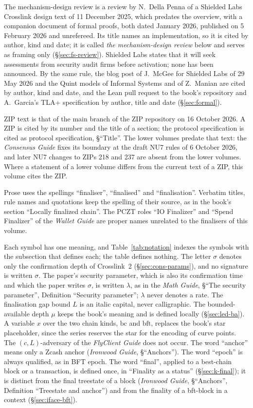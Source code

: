 \documentclass[11pt,a4paper]{article}
\theoremstyle{definition}
\newcommand{\bc}{\mathrm{bc}}
\newcommand{\bft}{\mathrm{bft}}
\begin{document}
The mechanism-design review is a review by N.~Della Penna of a Shielded Labs
Crosslink design text of 11 December 2025, which predates the overview, with
a companion document of formal proofs, both dated January 2026, published on
5 February 2026 and unrefereed. Its title names an implementation, so it is
cited by author, kind and date; it is called \emph{the mechanism-design review}
below and serves as framing only (\S\ref{sec:fs-review}). Shielded Labs states
that it will seek assessments from security audit firms before activation; none
has been announced. By the same rule, the blog post of J.~McGee for Shielded
Labs of 29 May 2026 and the Quint models of Informal Systems and of Z.~Manian
are cited by author, kind and date, and the Lean pull request to the book's
repository and A.~Garcia's TLA+ specification by author, title and date
(\S\ref{sec:formal}).

ZIP text is that of the main branch of the ZIP repository on 16 October
2026. A ZIP is cited by its number and the title of a section; the protocol
specification is cited as protocol specification, \S``Title''. The lower
volumes predate that text: the \emph{Consensus Guide} fixes its boundary at
the draft NU7 rules of 6 October 2026, and later NU7 changes to ZIPs 218 and
237 are absent from the lower volumes. Where a statement of a lower volume
differs from the current text of a ZIP, this volume cites the ZIP.

Prose uses the spellings ``finaliser'', ``finalised'' and ``finalisation''.
Verbatim titles, rule names and quotations keep the spelling of their source,
as in the book's section ``Locally finalized chain''. The PCZT roles ``IO
Finalizer'' and ``Spend Finalizer'' of the \emph{Wallet Guide} are proper
names unrelated to the finalisers of this volume.

Each symbol has one meaning, and Table~\ref{tab:notation} indexes the symbols
with the subsection that defines each; the table defines nothing. The letter
$\sigma$ denotes only the confirmation depth of Crosslink~2
(\S\ref{sec:cons-params}), and no signature is written $\sigma$. The paper's
security parameter, which is also its confirmation time and which the paper
writes $\sigma$, is written $\lambda$, as in the \emph{Math Guide},
\S``The security parameter'', Definition ``Security parameter''; $\lambda$
never denotes a rate. The finalisation gap bound $L$ is an italic capital,
never calligraphic. The bounded-available depth $\mu$ keeps the book's
meaning and is defined locally (\S\ref{sec:led-ba}). A variable $x$ over the
two chain kinds, $\bc$ and $\bft$, replaces the book's star placeholder,
since the series reserves the star for the encoding of curve points. The
$(c, L)$-adversary of the \emph{FlyClient Guide} does not occur. The word
``anchor'' means only a Zcash anchor (\emph{Ironwood Guide},
\S``Anchors''). The word ``epoch'' is always qualified, as in BFT epoch. The
word ``final'', applied to a best-chain block or a transaction, is defined
once, in ``Finality as a status'' (\S\ref{sec:k-final}); it is distinct from
the final treestate of a block (\emph{Ironwood Guide}, \S``Anchors'',
Definition ``Treestate and anchor'') and from the finality of a bft-block in
a context (\S\ref{sec:iface-bft}).
\end{document}
